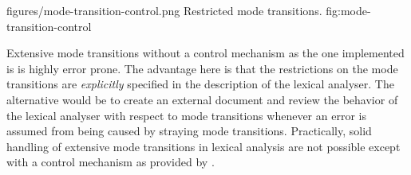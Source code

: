 \showpic
{figures/mode-transition-control.png}
{Restricted mode transitions.}
{fig:mode-transition-control}


Extensive mode transitions without a control mechanism as the one implemented
is {\quex} is highly error prone. The advantage here is that the restrictions
on the mode transitions are {\it explicitly\/} specified in the description of
the lexical analyser. The alternative would be to create an external document
and review the behavior of the lexical analyser with respect to mode
transitions whenever an error is assumed from being caused by straying mode
transitions. Practically, solid handling of extensive mode transitions in
lexical analysis are not possible except with a control mechanism as provided
by {\quex}.

